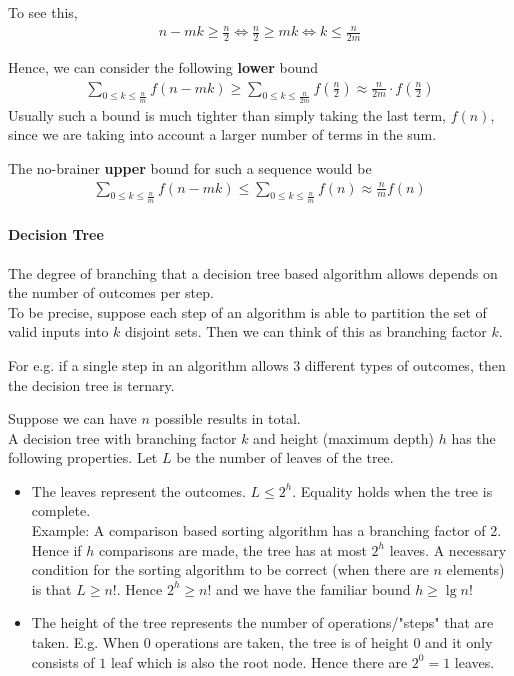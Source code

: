 \documentclass{article}
\begin{document}
To see this,
\begin{align*}
	n-mk\geq \frac{n}{2}\iff \frac{n}{2}\geq mk\iff k\leq \frac{n}{2m}
\end{align*}

Hence, we can consider the following \textbf{lower} bound
\begin{align*}
	\sum_{0\leq k\leq \frac{n}{m}}f(n-mk) \geq \sum_{0\leq k\leq \frac{n}{2m}}f(\frac{n}{2}) \approx \frac{n}{2m}\cdot f(\frac{n}{2})
\end{align*}
Usually such a bound is much tighter than simply taking the last term, $f(n)$, since we are taking into account a larger number of terms in the sum.

The no-brainer \textbf{upper} bound for such a sequence would be
\begin{align*}
	\sum_{0\leq k\leq \frac{n}{m}}f(n-mk) \leq \sum_{0\leq k\leq \frac{n}{m}}f(n)\approx \frac{n}{m}f(n) 
\end{align*}

\paragraph{Decision Tree}
The degree of branching that a decision tree based algorithm allows depends on the number of outcomes per step.\\
To be precise, suppose each step of an algorithm is able to partition the set of valid inputs into $k$ disjoint sets. Then we can think of this as branching factor $k$.

For e.g. if a single step in an algorithm allows 3 different types of outcomes, then the decision tree is ternary.

Suppose we can have $n$ possible results in total.\\
A decision tree with branching factor $k$ and height (maximum depth) $h$ has the following properties. Let $L$ be the number of leaves of the tree.
\begin{itemize}
	\item The leaves represent the outcomes. $L\leq 2^h$. Equality holds when the tree is complete.\\
	Example: A comparison based sorting algorithm has a branching factor of 2. Hence if $h$ comparisons are made, the tree has at most $2^h$ leaves. A necessary condition for the sorting algorithm to be correct (when there are $n$ elements) is that $L\geq n!$. Hence $2^h\geq n!$ and we have the familiar bound $h\geq \lg n!$
	\item The height of the tree represents the number of operations/"steps" that are taken. E.g. When $0$ operations are taken, the tree is of height $0$ and it only consists of $1$ leaf which is also the root node. Hence there are $2^0 = 1$ leaves.
\end{itemize}
\end{document}
